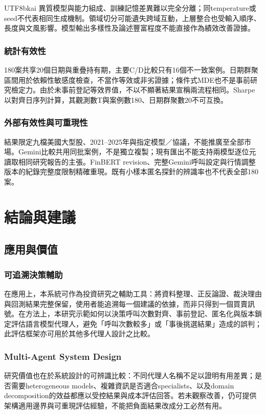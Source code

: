 \documentclass[12pt,a4paper]{article}
\begin{document}
\begin{CJK}{UTF8}{bkai}
異質模型與能力組成、訓練記憶差異難以完全分離；同temperature或seed不代表相同生成機制。領域切分可能遺失跨域互動，上層整合也受輸入順序、長度與文風影響。模型輸出多樣性及論述豐富程度不能直接作為績效改善證據。

\subsubsection{統計有效性}
180案共享20個日期與重疊持有期，主要C/D比較只有16個不一致案例。日期群聚區間用於依賴性敏感度檢查，不當作等效或非劣證據；條件式MDE也不是事前研究檢定力。由於未事前登記等效界值，不以不顯著結果宣稱兩流程相同。Sharpe以對齊日序列計算，其觀測數T與案例數180、日期群聚數20不可互換。

\subsubsection{外部有效性與可重現性}
結果限定九檔美國大型股、2021--2025年與指定模型／協議，不能推廣至全部市場。Gemini比較共用同批案例，不是獨立複製；現有匯出不能支持兩模型逐位元讀取相同研究報告的主張。FinBERT revision、完整Gemini呼叫設定與行情調整版本的紀錄完整度限制精確重現。既有小樣本匿名探針的辨識率也不代表全部180案。


\section{結論與建議}



\subsection{應用與價值}

\subsubsection{可追溯決策輔助}
在應用上，本系統可作為投資研究之輔助工具：將資料整理、正反論證、裁決理由與回測結果完整保留，使用者能追溯每一個建議的依據，而非只得到一個買賣訊號。在方法上，本研究示範如何以決策呼叫次數對齊、事前登記、匿名化與版本鎖定評估語言模型代理人，避免「呼叫次數較多」或「事後挑選結果」造成的誤判；此評估框架亦可用於其他多代理人設計之比較。
\subsubsection{Multi-Agent System Design}

研究價值也在於系統設計的可辨識比較：不同代理人名稱不足以證明有用差異；是否需要heterogeneous models、複雜資訊是否適合specialists、以及domain decomposition的效益都應以受控結果與成本評估回答。若未觀察改善，仍可提供架構適用邊界與可重現評估經驗，不能把負面結果改成分工必然有用。


\end{CJK}
\end{document}
